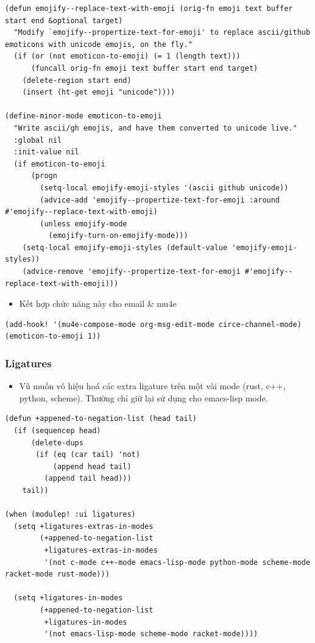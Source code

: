 \documentclass[11pt]{article}
\begin{document}
\begin{verbatim}
(defun emojify--replace-text-with-emoji (orig-fn emoji text buffer start end &optional target)
  "Modify `emojify--propertize-text-for-emoji' to replace ascii/github emoticons with unicode emojis, on the fly."
  (if (or (not emoticon-to-emoji) (= 1 (length text)))
      (funcall orig-fn emoji text buffer start end target)
    (delete-region start end)
    (insert (ht-get emoji "unicode"))))

(define-minor-mode emoticon-to-emoji
  "Write ascii/gh emojis, and have them converted to unicode live."
  :global nil
  :init-value nil
  (if emoticon-to-emoji
      (progn
        (setq-local emojify-emoji-styles '(ascii github unicode))
        (advice-add 'emojify--propertize-text-for-emoji :around #'emojify--replace-text-with-emoji)
        (unless emojify-mode
          (emojify-turn-on-emojify-mode)))
    (setq-local emojify-emoji-styles (default-value 'emojify-emoji-styles))
    (advice-remove 'emojify--propertize-text-for-emoji #'emojify--replace-text-with-emoji)))
\end{verbatim}

\begin{itemize}
\item Kết hợp chức năng này cho email \& mu4e
\end{itemize}

\begin{verbatim}
(add-hook! '(mu4e-compose-mode org-msg-edit-mode circe-channel-mode) (emoticon-to-emoji 1))
\end{verbatim}

\subsubsection{Ligatures}
\label{sec:orgee72e4c}
\begin{itemize}
\item Vũ muốn vô hiệu hoá các extra ligature trên một vài mode (rust, c++, python,
scheme). Thường chỉ giữ lại sử dụng cho emacs-lisp mode.
\end{itemize}

\begin{verbatim}
(defun +appened-to-negation-list (head tail)
  (if (sequencep head)
      (delete-dups
       (if (eq (car tail) 'not)
           (append head tail)
         (append tail head)))
    tail))

(when (modulep! :ui ligatures)
  (setq +ligatures-extras-in-modes
        (+appened-to-negation-list
         +ligatures-extras-in-modes
         '(not c-mode c++-mode emacs-lisp-mode python-mode scheme-mode racket-mode rust-mode)))

  (setq +ligatures-in-modes
        (+appened-to-negation-list
         +ligatures-in-modes
         '(not emacs-lisp-mode scheme-mode racket-mode))))
\end{verbatim}
\end{document}
